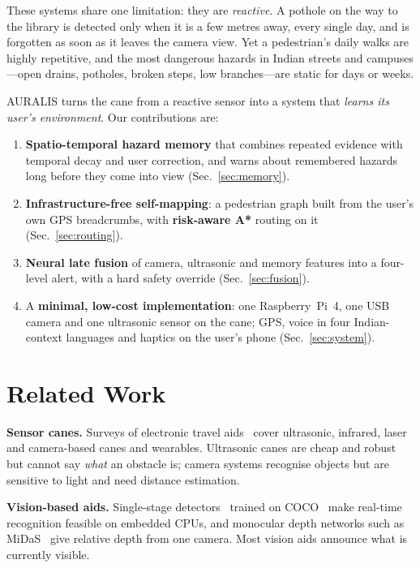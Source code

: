 \documentclass[conference]{IEEEtran}
\begin{document}
These systems share one limitation: they are \emph{reactive}. A pothole on the way to the library is detected only when it is a few metres away, every single day, and is forgotten as soon as it leaves the camera view. Yet a pedestrian's daily walks are highly repetitive, and the most dangerous hazards in Indian streets and campuses---open drains, potholes, broken steps, low branches---are static for days or weeks.

AURALIS turns the cane from a reactive sensor into a system that \emph{learns its user's environment}. Our contributions are:
\begin{enumerate}
\item \textbf{Spatio-temporal hazard memory} that combines repeated evidence with temporal decay and user correction, and warns about remembered hazards long before they come into view (Sec.~\ref{sec:memory}).
\item \textbf{Infrastructure-free self-mapping}: a pedestrian graph built from the user's own GPS breadcrumbs, with \textbf{risk-aware A*} routing on it (Sec.~\ref{sec:routing}).
\item \textbf{Neural late fusion} of camera, ultrasonic and memory features into a four-level alert, with a hard safety override (Sec.~\ref{sec:fusion}).
\item A \textbf{minimal, low-cost implementation}: one Raspberry~Pi~4, one USB camera and one ultrasonic sensor on the cane; GPS, voice in four Indian-context languages and haptics on the user's phone (Sec.~\ref{sec:system}).
\end{enumerate}

\section{Related Work}
\textbf{Sensor canes.} Surveys of electronic travel aids~\cite{dakopoulos2010,elmannai2017,real2019,kuriakose2022} cover ultrasonic, infrared, laser and camera-based canes and wearables. Ultrasonic canes are cheap and robust but cannot say \emph{what} an obstacle is; camera systems recognise objects but are sensitive to light and need distance estimation.

\textbf{Vision-based aids.} Single-stage detectors~\cite{redmon2016,yolov8} trained on COCO~\cite{lin2014} make real-time recognition feasible on embedded CPUs, and monocular depth networks such as MiDaS~\cite{ranftl2022} give relative depth from one camera. Most vision aids announce what is currently visible.
\end{document}
